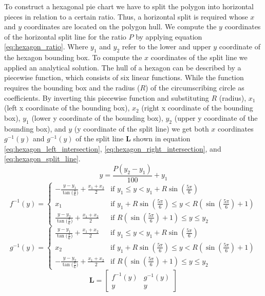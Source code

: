 		To construct a hexagonal pie chart we have to split the polygon into horizontal pieces in relation to a certain ratio. Thus, a horizontal split is required whose $x$ and $y$ coordinates are located on the polygon hull. We compute the $y$ coordinates of the horizontal split line for the ratio $P$ by applying equation \ref{eq:hexagon_ratio}. Where $y_1$ and $y_2$ refer to the lower and upper $y$ coordinate of the hexagon bounding box. To compute the $x$ coordinates of the split line we applied an analytical solution. The hull of a hexagon can be described by a piecewise function, which consists of six linear functions. While the function requires the bounding box and the radius ($R$) of the circumscribing circle as coefficients. By inverting this piecewise function and substituting $R$ (radius), $x_1$ (left x coordinate of the bounding box), $x_2$ (right x coordinate of the bounding box), $y_1$ (lower y coordinate of the bounding box), $y_2$ (upper y coordinate of the bounding box), and $y$ (y coordinate of the split line) we get both $x$ coordinates $g^{-1}(y)$ and $g^{-1}(y)$ of the split line $\mathbf{L}$ shown in equation \ref{eq:hexagon_left_intersection}, \ref{eq:hexagon_right_intersection}, and \ref{eq:hexagon_split_line}.
		\begin{equation}
		\label{eq:hexagon_ratio}
			y = \frac{P(y_2-y_1)}{100} + y_1
		\end{equation}
		\begin{equation}
		\label{eq:hexagon_left_intersection}
			f^{-1}(y) =
			\begin{cases} 
				-\frac{y - y_1}{\tan{(\frac{\pi}{6}})} + \frac{x_1 + x_2}{2} & \text{if } y_1 \le y < y_1 + R\sin{(\frac{5\pi}{6})} \\
				x_1 & \text{if } y_1 + R\sin{(\frac{5\pi}{6})} \le y < R(\sin{(\frac{5\pi}{6})} + 1) \\
				\frac{y - y_2}{\tan{(\frac{\pi}{6}})} + \frac{x_1 + x_2}{2} & \text{if } R(\sin{(\frac{5\pi}{6})} + 1) \le y \le y_2
			\end{cases}
		\end{equation}
		\begin{equation}
		\label{eq:hexagon_right_intersection}
			g^{-1}(y) = 
			\begin{cases} 
				\frac{y - y_1}{\tan{(\frac{\pi}{6}})} + \frac{x_1 + x_2}{2} & \text{if } y_1 \le y < y_1 + R\sin{(\frac{5\pi}{6})} \\
				x_2 & \text{if } y_1 + R\sin{(\frac{5\pi}{6})} \le y < R(\sin{(\frac{5\pi}{6})} + 1) \\
				-\frac{y - y_2}{\tan{(\frac{\pi}{6}})} + \frac{x_1 + x_2}{2} & \text{if } R(\sin{(\frac{5\pi}{6})} + 1) \le y \le y_2
			\end{cases}
		\end{equation}
		\begin{equation}
		\label{eq:hexagon_split_line}
			\mathbf{L} =
			\begin{bmatrix}
				f^{-1}(y) & g^{-1}(y) \\
				y & y
			\end{bmatrix}
		\end{equation}

